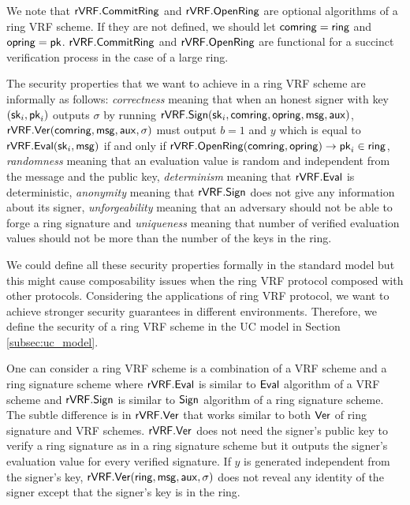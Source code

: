 We note that $ {\mathsf{rVRF}}.{\mathsf{CommitRing}} $ and $  {\mathsf{rVRF}}.{\mathsf{OpenRing}} $ are optional algorithms of a ring VRF scheme. If they are not defined, we should let $ \mathsf{comring} = \mathsf{ring} $ and $ \mathsf{opring}  = \mathsf{pk}$. $ {\mathsf{rVRF}}.{\mathsf{CommitRing}} $ and $  {\mathsf{rVRF}}.{\mathsf{OpenRing}} $ are functional for a succinct verification process in the case of a large ring.

The security properties that we want to achieve in a ring VRF scheme are informally as follows: \emph{correctness} meaning that when an honest signer with key $ (\mathsf{sk}_i,\mathsf{pk}_i) $ outputs $ \sigma $ by running $ {\mathsf{rVRF}}.{\mathsf{Sign}}(\mathsf{sk}_i, \mathsf{comring},\mathsf{opring}, \mathsf{msg}, \mathsf{aux}) $, $ {\mathsf{rVRF}}.{\mathsf{Ver}}(\mathsf{comring},\mathsf{msg},\mathsf{aux},\sigma)  $ must output $ b =1 $ and $ y $ which is equal to $ {\mathsf{rVRF}}.{\mathsf{Eval}}(\mathsf{sk}_i, \mathsf{msg}) $ if and only if $ {\mathsf{rVRF}}.{\mathsf{OpenRing}}(\mathsf{comring},\mathsf{opring}) \rightarrow \mathsf{pk}_i \in \mathsf{ring}$, \emph{randomness} meaning that an evaluation value is random and independent from the message and the public key, \emph{determinism} meaning that $ {\mathsf{rVRF}}.{\mathsf{Eval}} $ is deterministic, \emph{anonymity} meaning that $ {\mathsf{rVRF}}.{\mathsf{Sign}} $ does not give any information about its signer, \emph{unforgeability} meaning that an adversary should not be able to forge a ring signature and \emph{uniqueness} meaning that number of verified evaluation values should not be more than the number of the keys in the ring.


We could define all these security properties formally in the standard model but this might cause composability issues when the ring VRF protocol composed with other protocols. Considering the applications of ring VRF protocol, we want to achieve stronger security guarantees in different environments. Therefore, we define the security of a ring VRF scheme in the UC model in Section \ref{subsec:uc_model}. 

One can consider a ring VRF scheme is a combination of a VRF scheme and a ring signature scheme where $ {\mathsf{rVRF}}.{\mathsf{Eval}} $ is similar to $ {\mathsf{Eval}} $ algorithm of a VRF scheme and $ {\mathsf{rVRF}}.{\mathsf{Sign}} $ is similar to $ {\mathsf{Sign}} $ algorithm of a ring signature scheme. The  subtle difference is in $ {\mathsf{rVRF}}.{\mathsf{Ver}} $ that works  similar to both $ {\mathsf{Ver}} $ of ring signature and VRF schemes.  $ {\mathsf{rVRF}}.{\mathsf{Ver}} $ does not need the signer's public key to verify a ring signature as in a ring signature scheme but it outputs the signer's evaluation value for every verified signature. If $ y $ is generated independent from the signer's key, $ {\mathsf{rVRF}}.{\mathsf{Ver}}(\mathsf{ring},\mathsf{msg},\mathsf{aux},\sigma) $ does not reveal any identity of the signer except that the signer's key is in the ring.


